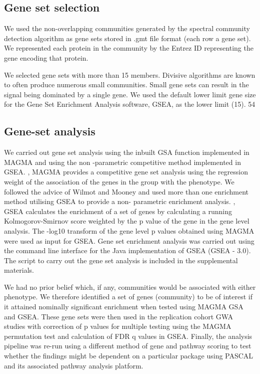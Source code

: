 \subsection{Gene set selection}
We used the non-overlapping communities generated by the spectral community detection algorithm as gene sets stored in .gmt file format (each row a gene set). We represented each protein in the community by the Entrez ID representing the gene encoding that protein. 

We selected gene sets with more than 15 members. Divisive algorithms are known to often produce numerous small communities. Small gene sets can result in the signal being dominated by a single gene. We used the default lower limit gene size for the Gene Set Enrichment Analysis software, GSEA, as the lower limit (15). 54  

\subsection{Gene-set analysis}

We carried out gene set analysis using the inbuilt GSA function implemented in MAGMA and using the non -parametric competitive method implemented in GSEA. \cite{de2015magma},\cite{subramanian2005gene}  MAGMA provides a competitive gene set analysis using the regression weight of the association of the genes in the group with the phenotype. \cite{de2015magma}  We followed the advice of Wilmot and Mooney and used more than one enrichment method utilising GSEA to provide a non- parametric enrichment analysis. \cite{subramanian2005gene},\cite{mooney2015gene}  GSEA calculates the enrichment of a set of genes by calculating a running Kolmogorov-Smirnov score weighted by the p value of the gene in the gene level analysis. The -log10 transform of the gene level p values obtained using MAGMA were used as input for GSEA. Gene set enrichment analysis was carried out using the command line interface for the Java implementation of GSEA (GSEA - 3.0). The script to carry out the gene set analysis is included in the supplemental materials. 

We had no prior belief which, if any, communities would be associated with either phenotype. We therefore identified a set of genes (community) to be of interest if it attained nominally significant enrichment when tested using MAGMA GSA and GSEA. These gene sets were then used in the replication cohort GWA studies with correction of p values for multiple testing using the MAGMA permutation test and calculation of FDR q values in GSEA. Finally, the analysis pipeline was re-run using a different method of gene and pathway scoring to test whether the findings might be dependent on a particular package using PASCAL and its associated pathway analysis platform. \cite{lamparter2016fast}  

